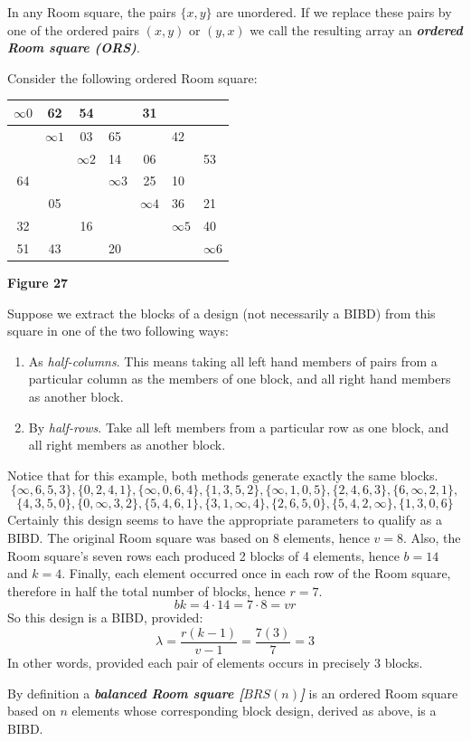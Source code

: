 \documentclass[
  12pt,
  a4paper]{book}
\begin{document}
In any Room square, the pairs \(\{x,y\}\) are unordered. If we replace
these pairs by one of the ordered pairs \((x,y)\) or \((y,x)\) we call the
resulting array an \textbf{\emph{ordered Room square (ORS)}}.

Consider the following ordered Room square:

\begin{longtable}[]{@{}ccclcll@{}}
\toprule
\(\infty 0\) & 62 & 54 & & 31 & &\tabularnewline
\midrule
\endhead
& \(\infty 1\) & 03 & 65 & & 42 &\tabularnewline
& & \(\infty 2\) & 14 & 06 & & 53\tabularnewline
64 & & & \(\infty 3\) & 25 & 10 &\tabularnewline
& 05 & & & \(\infty 4\) & 36 & 21\tabularnewline
32 & & 16 & & & \(\infty 5\) & 40\tabularnewline
51 & 43 & & 20 & & & \(\infty 6\)\tabularnewline
\bottomrule
\end{longtable}

\textbf{Figure 27}

Suppose we extract the blocks of a design (not necessarily a BIBD) from
this square in one of the two following ways:

\begin{enumerate}
\def\labelenumi{\arabic{enumi}.}
\item
  As \emph{half-columns}. This means taking all left hand members of pairs
  from a particular column as the members of one block, and all right
  hand members as another block.
\item
  By \emph{half-rows}. Take all left members from a particular row as one
  block, and all right members as another block.
\end{enumerate}

Notice that for this example, both methods generate exactly the same
blocks.
\[\{\infty,6,5,3\},\{0,2,4,1\},\{\infty,0,6,4\},\{1,3,5,2\},\{\infty,1,0,5\},\{2,4,6,3\},\{6, \infty,2,1\},\]
\[\{4,3,5,0\},\{0,\infty,3,2\},\{5,4,6,1\},\{3,1,\infty,4\},\{2,6,5,0\},\{5,4,2,\infty\},\{1, 3,0,6\}\]
Certainly this design seems to have the appropriate parameters to
qualify as a BIBD. The original Room square was based on 8 elements,
hence \(v=8\). Also, the Room square's seven rows each produced 2 blocks
of 4 elements, hence \(b=14\) and \(k=4\). Finally, each element occurred
once in each row of the Room square, therefore in half the total number
of blocks, hence \(r=7\). \[bk=4\cdot 14 = 7 \cdot 8 = vr\] So this design
is a BIBD, provided: \[\lambda = \frac{r(k-1)}{v-1} = \frac{7(3)}{7}=3\]
In other words, provided each pair of elements occurs in precisely 3
blocks.

By definition a \textbf{\emph{balanced Room square {[}\(BRS(n)\){]}}} is an ordered Room
square based on \(n\) elements whose corresponding block design, derived
as above, is a BIBD.
\end{document}
